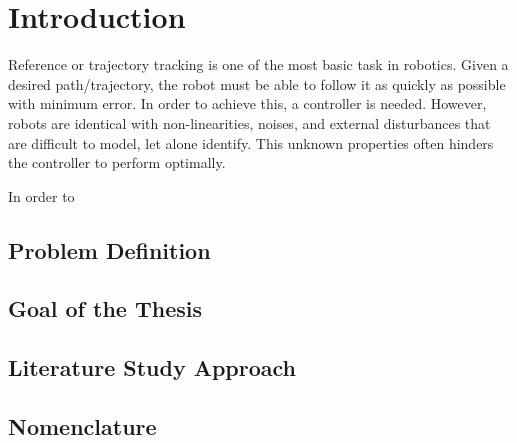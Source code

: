 %
\chapter{Introduction} \label{chap::intro}
Reference or trajectory tracking is one of the most basic task in robotics. Given a desired path/trajectory, the robot must be able to follow it as quickly as possible with minimum error. In order to achieve this, a controller is needed. However, robots are identical with non-linearities, noises, and external disturbances that are difficult to model, let alone identify. This unknown properties often hinders the controller to perform optimally.

In order to





\section{Problem Definition}

\section{Goal of the Thesis}

\section{Literature Study Approach}

\section{Nomenclature}


